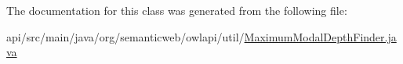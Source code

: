 The documentation for this class was generated from the following file\-:\begin{DoxyCompactItemize}
\item 
api/src/main/java/org/semanticweb/owlapi/util/\hyperlink{_maximum_modal_depth_finder_8java}{Maximum\-Modal\-Depth\-Finder.\-java}\end{DoxyCompactItemize}
